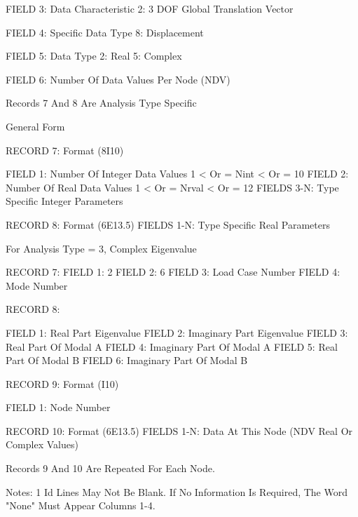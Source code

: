 \documentclass[10pt,openany,twoside]{book}
\numberwithin{equation}{section}   %
\begin{document}
\begin{example}
               FIELD 3:  Data Characteristic
                           2:   3 DOF Global Translation
                                Vector

               FIELD 4: Specific Data Type
                           8:   Displacement

               FIELD 5:  Data Type
                           2:   Real
                           5:   Complex

               FIELD 6:  Number Of Data Values Per Node (NDV)


          Records 7 And 8 Are Analysis Type Specific

          General Form

          RECORD 7:      Format (8I10)

               FIELD 1:          Number Of Integer Data Values
                           1 < Or = Nint < Or = 10
               FIELD 2:          Number Of Real Data Values
                           1 < Or = Nrval < Or = 12
               FIELDS 3-N:       Type Specific Integer Parameters


          RECORD 8:      Format (6E13.5)
               FIELDS 1-N:       Type Specific Real Parameters


          For Analysis Type = 3, Complex Eigenvalue

          RECORD 7:
               FIELD 1:    2
               FIELD 2:    6
               FIELD 3:    Load Case Number
               FIELD 4:    Mode Number

          RECORD 8:

               FIELD 1:    Real Part Eigenvalue
               FIELD 2:    Imaginary Part Eigenvalue
               FIELD 3:    Real Part Of Modal A
               FIELD 4:    Imaginary Part Of Modal A
               FIELD 5:    Real Part Of Modal B
               FIELD 6:    Imaginary Part Of Modal B


          RECORD 9:      Format (I10)

               FIELD 1:          Node Number

          RECORD 10:     Format (6E13.5)
               FIELDS 1-N:       Data At This Node (NDV Real Or
                         Complex Values)

          Records 9 And 10 Are Repeated For Each Node.


          Notes:
          1        Id Lines May Not Be Blank.  If No Information Is
                      Required, The Word "None" Must Appear  Columns 1-4.


\end{example}
\end{document}
